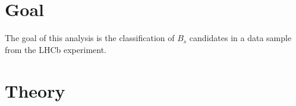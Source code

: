 \section{Goal}
\label{sec:Goal}

The goal of this analysis is the classification of $B_s$ candidates in a data sample from the LHCb experiment. 


\section{Theory}
\label{sec:Theory}
 
\cite{sample}
